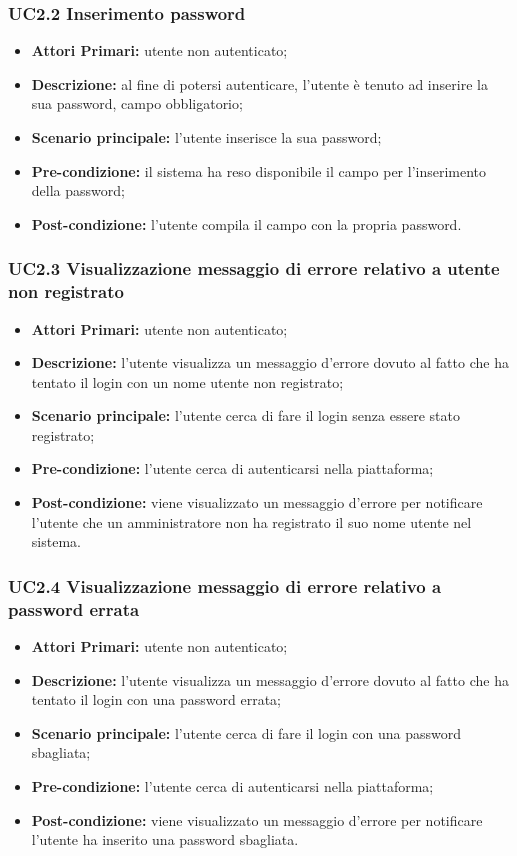 \subsubsection{UC2.2 Inserimento password}
\begin{itemize}
	\item \textbf{Attori Primari:} utente non autenticato;
	\item \textbf{Descrizione:} al fine di potersi autenticare, l'utente è tenuto ad inserire la sua password, campo obbligatorio;
	\item \textbf{Scenario principale:} l'utente inserisce la sua password;
	\item \textbf{Pre-condizione:} il sistema ha reso disponibile il campo per l'inserimento della password;
	\item \textbf{Post-condizione:} l'utente compila il campo con la propria password.
\end{itemize}	

\subsubsection{UC2.3 Visualizzazione messaggio di errore relativo a utente non registrato}
\begin{itemize}
	\item \textbf{Attori Primari:} utente non autenticato;
	\item \textbf{Descrizione:} l'utente visualizza un messaggio d'errore dovuto al fatto che ha tentato il login con un nome utente non registrato;
	\item \textbf{Scenario principale:} l'utente cerca di fare il login senza essere stato registrato;
	\item \textbf{Pre-condizione:} l'utente cerca di autenticarsi nella piattaforma;
	\item \textbf{Post-condizione:} viene visualizzato un messaggio d'errore per notificare l'utente che un amministratore non ha registrato il suo nome utente nel sistema.
\end{itemize}

\subsubsection{UC2.4 Visualizzazione messaggio di errore relativo a password errata}
\begin{itemize}
	\item \textbf{Attori Primari:} utente non autenticato;
	\item \textbf{Descrizione:} l'utente visualizza un messaggio d'errore dovuto al fatto che ha tentato il login con una password errata;
	\item \textbf{Scenario principale:} l'utente cerca di fare il login con una password sbagliata;
	\item \textbf{Pre-condizione:} l'utente cerca di autenticarsi nella piattaforma;
	\item \textbf{Post-condizione:} viene visualizzato un messaggio d'errore per notificare l'utente ha inserito una password sbagliata.
\end{itemize}



